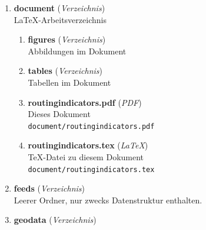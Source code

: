 \begin{enumerate}[label=\arabic*., leftmargin=*, itemsep=0.5em, topsep=0.3em]
\begin{enumerate}[label=\arabic{enumi}.\arabic*, leftmargin=*, itemsep=0.5em, topsep=0.3em]
\texttt{\small code/mean\_frequencies.R}
\item \textbf{osmconf\_cpt.txt} \textnormal{(\textit{Text})}\\
Konfiguration von osmextract zum Extrahieren von POI aus OSM-Daten.\\
\texttt{\small code/osmconf\_cpt.txt}
\item \textbf{stop\_frequencies\_methods.R} \textnormal{(\textit{R})}\\
Frühere Version von 04\_stop\_frequencies\_de\_gtfs, genutzt um Grafiken zur stichprobenartigen Überprüfung der Ergebnisse zu erstellen.
Im weiteren Verlauf nicht aktualisiert, daher nicht funktionsfähig.\\
\texttt{\small code/stop\_frequencies\_methods.R}
\item \textbf{tags\_filter.cmd} \textnormal{(\textit{CMD})}\\
osmium-Ausdruck zum Vorfiltern des OSM-Datensatzes\\
\texttt{\small code/tags\_filter.cmd}
\end{enumerate}
\item \textbf{document} \textnormal{(\textit{Verzeichnis})}\\
\LaTeX-Arbeitsverzeichnis
\begin{enumerate}[label=\arabic{enumi}.\arabic*, leftmargin=*, itemsep=0.5em, topsep=0.3em]
\item \textbf{figures} \textnormal{(\textit{Verzeichnis})}\\
Abbildungen im Dokument
\item \textbf{tables} \textnormal{(\textit{Verzeichnis})}\\
Tabellen im Dokument
\item \textbf{routingindicators.pdf} \textnormal{(\textit{PDF})}\\
Dieses Dokument\\
\texttt{\small document/routingindicators.pdf}
\item \textbf{routingindicators.tex} \textnormal{(\textit{LaTeX})}\\
\TeX-Datei zu diesem Dokument\\
\texttt{\small document/routingindicators.tex}
\end{enumerate}
\item \textbf{feeds} \textnormal{(\textit{Verzeichnis})}\\
Leerer Ordner, nur zwecks Datenstruktur enthalten.
\item \textbf{geodata} \textnormal{(\textit{Verzeichnis})}\\

\end{enumerate}
